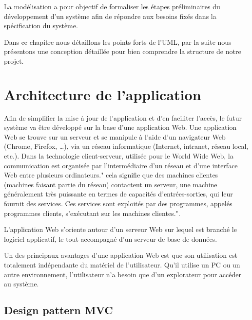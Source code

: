 

\hspace{4mm} La modélisation a pour objectif de formaliser les étapes préliminaires du développement d'un système afin de répondre aux besoins fixés dans la spécification du système. 
\par Dans ce chapitre nous détaillons les points forts de l’UML, par la suite nous présentons une conception détaillée pour bien comprendre la structure de notre projet. 
\section{	Architecture de l'application  }

\hspace{4mm} Afin de simplifier la mise à jour de l’application et d’en faciliter l’accès, le futur système va être développé sur la base d’une application Web. Une application Web se trouve sur un serveur et se manipule à l'aide d'un navigateur Web (Chrome, Firefox, …), via un réseau informatique (Internet, intranet, réseau local, etc.). Dans la technologie client-serveur, utilisée pour le World Wide Web, la communication est organisée par l'intermédiaire d'un réseau et d'une interface Web entre plusieurs ordinateurs." cela signifie que des machines clientes (machines faisant partie du réseau) contactent un serveur, une machine généralement très puissante en termes de capacités d'entrées-sorties, qui leur fournit des services. Ces services sont exploités par des programmes, appelés programmes clients, s'exécutant sur les machines clientes."\cite{12}.  
\par L'application Web s'oriente autour d'un serveur Web sur lequel est branché le logiciel applicatif, le tout accompagné d'un serveur de base de données.  
\par 
	Un des principaux avantages d’une application Web est que son utilisation est totalement indépendante du matériel de l’utilisateur. Qu’il utilise un PC ou un autre environnement, l’utilisateur n'a besoin que d’un explorateur pour accéder au système.


\subsection{	Design pattern MVC    }


